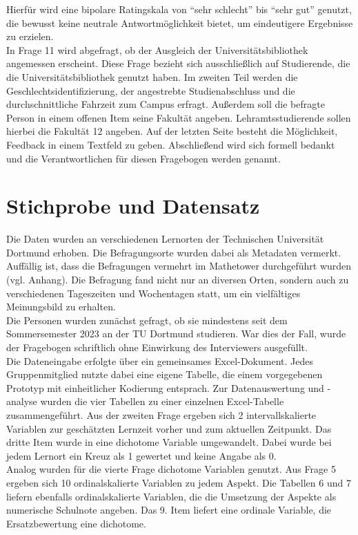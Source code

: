 \documentclass[11pt, a4paper]{article}
\begin{document}
Hierfür wird eine bipolare Ratingskala von “sehr schlecht” bis “sehr gut” genutzt, die bewusst keine neutrale Antwortmöglichkeit bietet, um eindeutigere Ergebnisse zu erzielen.\\
In Frage 11 wird abgefragt, ob der Ausgleich der Universitätsbibliothek angemessen erscheint. Diese Frage bezieht sich ausschließlich auf Studierende, die die Universitätsbibliothek genutzt haben.
Im zweiten Teil werden die Geschlechtsidentifizierung, der angestrebte Studienabschluss und die durchschnittliche Fahrzeit zum Campus erfragt.
Außerdem soll die befragte Person in einem offenen Item seine Fakultät angeben.
Lehramtsstudierende sollen hierbei die Fakultät 12 angeben.
Auf der letzten Seite besteht die Möglichkeit, Feedback in einem Textfeld zu geben.
Abschließend wird sich formell bedankt und die Verantwortlichen für diesen Fragebogen werden genannt.

\newpage
\section{Stichprobe und Datensatz}
\label{Stichprobe und Datensatz}

Die Daten wurden an verschiedenen Lernorten der Technischen Universität Dortmund erhoben. Die Befragungsorte wurden dabei als Metadaten vermerkt. Auffällig ist, dass die Befragungen vermehrt im Mathetower durchgeführt wurden (vgl. Anhang). Die Befragung fand nicht nur an diversen Orten, sondern auch zu verschiedenen Tageszeiten und Wochentagen statt, um ein vielfältiges Meinungsbild zu erhalten.\\

Die Personen wurden zunächst gefragt, ob sie mindestens seit dem Sommersemester 2023 an der TU Dortmund studieren. War dies der Fall, wurde der Fragebogen schriftlich ohne Einwirkung des Interviewers ausgefüllt.\\
Die Dateneingabe erfolgte über ein gemeinsames Excel-Dokument. Jedes Gruppenmitglied nutzte dabei eine eigene Tabelle, die einem vorgegebenen Prototyp mit einheitlicher Kodierung entsprach. Zur Datenauswertung und -analyse wurden die vier Tabellen zu einer einzelnen Excel-Tabelle zusammengeführt. Aus der zweiten Frage ergeben sich 2 intervallskalierte Variablen zur geschätzten Lernzeit vorher und zum aktuellen Zeitpunkt. Das dritte Item wurde in eine dichotome Variable umgewandelt. Dabei wurde bei jedem Lernort ein Kreuz als 1 gewertet und keine Angabe als 0. \\
Analog wurden für die vierte Frage dichotome Variablen genutzt. Aus Frage 5 ergeben sich 10 ordinalskalierte Variablen zu jedem Aspekt. Die Tabellen 6 und 7 liefern ebenfalls ordinalskalierte Variablen, die die Umsetzung der Aspekte als numerische Schulnote angeben. Das 9. Item liefert eine ordinale Variable, die Ersatzbewertung eine dichotome.\\
\end{document}
